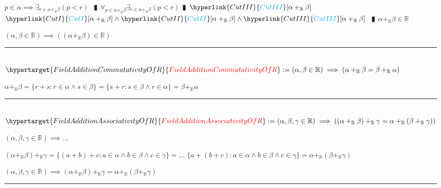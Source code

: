 \documentclass{book}
\newcommand{\df}[1]{\hypertarget{#1}{\textcolor{red}{#1}}}
\newcommand{\rf}[1]{\hyperlink{#1}{\textcolor{cyan}{#1}}}
\newcommand{\abr}{:=}
\newcommand{\pipe}{$\phantom{(}\vrectangleblack\phantom{)}$}
\newcommand{\pr}[1]{\left(#1\right)}
\begin{document}
\begin{enumerate}
\begin{enumerate}
\begin{enumerate}
    \end{enumerate}
    \lit $p \in \alpha \implies \exists_{r \in \alpha +_{\mathbb{R}} \beta}(p < r)$ \pipe $\forall_{p \in \alpha +_{\mathbb{R}} \beta} \exists_{r \in \alpha +_{\mathbb{R}} \beta}(p < r)$\pipe $\rf{CutIII}[\alpha +_{\mathbb{R}} \beta]$
    \lit $\rf{CutI}[\alpha +_{\mathbb{R}} \beta] \land \rf{CutII}[\alpha +_{\mathbb{R}} \beta] \land \rf{CutIII}[\alpha +_{\mathbb{R}} \beta]$ \pipe $\alpha +_{\mathbb{R}} \beta \in \mathbb{R}$
  \end{enumerate}
  \lit $(\alpha, \beta \in \mathbb{R}) \implies \pr{(\alpha +_{\mathbb{R}} \beta) \in \mathbb{R}}$
\end{enumerate} \vspace{.75mm} \hrule \vspace{.75mm} \ \\

$\df{FieldAdditionCommutativityOfR} \abr (\alpha, \beta \in \mathbb{R}) \implies (\alpha +_{\mathbb{R}} \beta = \beta +_{\mathbb{R}} \alpha)$
\begin{enumerate}
  \lit $\alpha +_{\mathbb{R}} \beta = \{r + s : r \in \alpha \land s \in \beta\} = \{s + r : s \in \beta \land r \in \alpha\} = \beta +_{\mathbb{R}} \alpha$
\end{enumerate} \vspace{.75mm} \hrule \vspace{.75mm} \ \\

$\df{FieldAdditionAssociativityOfR} \abr (\alpha, \beta, \gamma \in \mathbb{R}) \implies \pr{(\alpha +_{\mathbb{R}} \beta) +_{\mathbb{R}} \gamma = \alpha +_{\mathbb{R}} (\beta +_{\mathbb{R}} \gamma)}$
\begin{enumerate}
  \lit $(\alpha, \beta, \gamma \in \mathbb{R}) \implies \ldots$
  \begin{enumerate}
    \lit $(\alpha +_{\mathbb{R}} \beta) +_{\mathbb{R}} \gamma = \{(a + b) + c : a \in \alpha \land b \in \beta \land c \in \gamma\} = \ldots$
    \lit $\{a + (b + c) : a \in \alpha \land b \in \beta \land c \in \gamma\} = \alpha +_{\mathbb{R}} (\beta +_{\mathbb{R}} \gamma)$
  \end{enumerate}
  \lit $(\alpha, \beta, \gamma \in \mathbb{R}) \implies (\alpha +_{\mathbb{R}} \beta) +_{\mathbb{R}} \gamma = \alpha +_{\mathbb{R}} (\beta +_{\mathbb{R}} \gamma)$
\end{enumerate} \vspace{.75mm} \hrule \vspace{.75mm} \ \\
\end{document}
